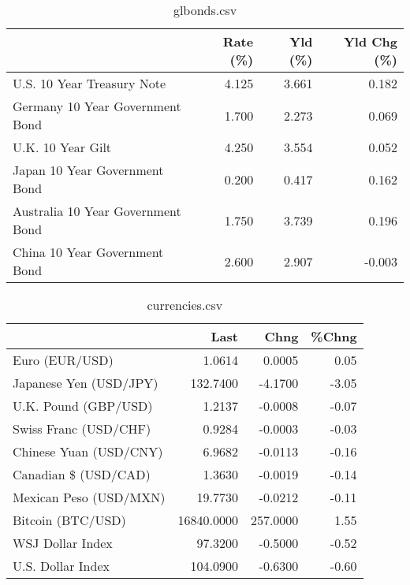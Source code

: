 \documentclass{article}%
\begin{document}
%


\begin{table}[htbp]%
\caption{glbonds.csv}%
\centering%
\begin{adjustbox}{width=1\textwidth}%
\begin{tabular}{lrrr}
\toprule
                                  &  Rate (\%) &  Yld (\%) &  Yld Chg (\%) \\
\midrule
       U.S. 10 Year Treasury Note &     4.125 &    3.661 &        0.182 \\
  Germany 10 Year Government Bond &     1.700 &    2.273 &        0.069 \\
                U.K. 10 Year Gilt &     4.250 &    3.554 &        0.052 \\
    Japan 10 Year Government Bond &     0.200 &    0.417 &        0.162 \\
Australia 10 Year Government Bond &     1.750 &    3.739 &        0.196 \\
    China 10 Year Government Bond &     2.600 &    2.907 &       -0.003 \\
\bottomrule
\end{tabular}
%
\end{adjustbox}%
\end{table}

%


\begin{table}[htbp]%
\caption{currencies.csv}%
\centering%
\begin{adjustbox}{width=1\textwidth}%
\begin{tabular}{lrrr}
\toprule
                       &       Last &     Chng &  \%Chng \\
\midrule
        Euro (EUR/USD) &     1.0614 &   0.0005 &   0.05 \\
Japanese Yen (USD/JPY) &   132.7400 &  -4.1700 &  -3.05 \\
  U.K. Pound (GBP/USD) &     1.2137 &  -0.0008 &  -0.07 \\
 Swiss Franc (USD/CHF) &     0.9284 &  -0.0003 &  -0.03 \\
Chinese Yuan (USD/CNY) &     6.9682 &  -0.0113 &  -0.16 \\
  Canadian \$ (USD/CAD) &     1.3630 &  -0.0019 &  -0.14 \\
Mexican Peso (USD/MXN) &    19.7730 &  -0.0212 &  -0.11 \\
     Bitcoin (BTC/USD) & 16840.0000 & 257.0000 &   1.55 \\
      WSJ Dollar Index &    97.3200 &  -0.5000 &  -0.52 \\
     U.S. Dollar Index &   104.0900 &  -0.6300 &  -0.60 \\
\bottomrule
\end{tabular}
%
\end{adjustbox}%
\end{table}

%
\end{document}
